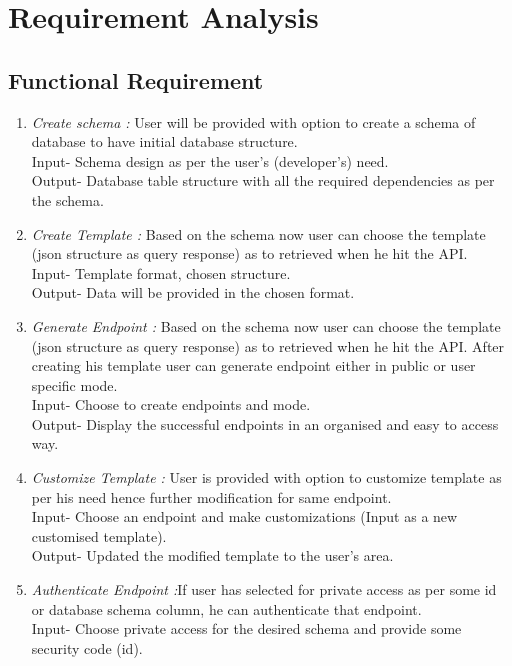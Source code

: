 \documentclass[a4paper,12pt]{report}
\begin{document}
    \vfill

    \section{Requirement Analysis}    
    \subsection{Functional Requirement}
    \begin{enumerate}
      \item {\emph {Create schema :} User will be provided with option to create a schema of database to have initial database structure. \\
      Input- Schema design as per the user’s (developer’s) need.  \\
      Output- Database table structure with all the required dependencies as per the schema.}
      \item {\emph {Create Template :} Based on the schema now user can choose the template (json structure as query response) as to retrieved when he hit the API. \\
        Input- Template format, chosen structure. \\
        Output- Data will be provided in the chosen format.
      }
      \item {\emph {Generate Endpoint :} Based on the schema now user can choose the template (json structure as query response) as to retrieved when he hit the API. After creating his template user can generate endpoint either in public or user specific mode.\\
        Input- Choose to create endpoints and mode. \\
        Output- Display the successful endpoints in an organised and easy to access way.
      }
      \item {\emph {Customize Template : } User is provided with option to customize template as per his need hence further modification for same endpoint.\\
        Input- Choose an endpoint and make customizations (Input as a new customised template).\\
        Output- Updated the modified template to the user’s area.
        }                        
      \item {\emph {Authenticate Endpoint :}If user has selected for private access as per some id or database schema column, he can authenticate that endpoint.\\
        Input- Choose private access for the desired schema and provide some security code (id).\\
}
\end{enumerate}
\end{document}
